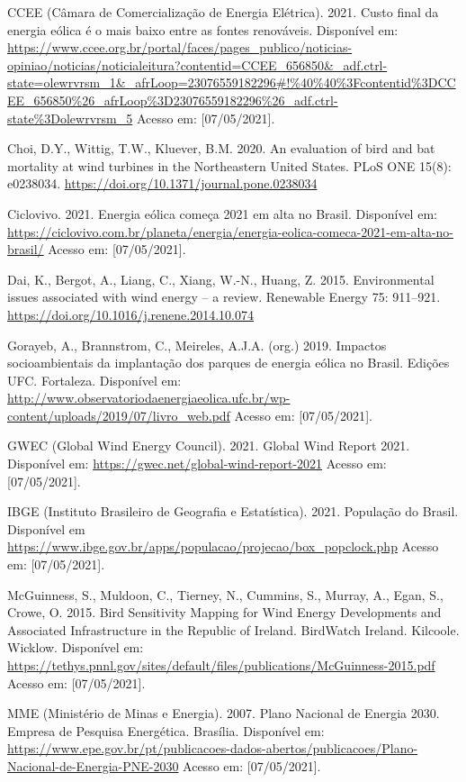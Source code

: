 \documentclass[
  oneside]{scrbook}
\begin{document}
CCEE (Câmara de Comercialização de Energia Elétrica). 2021. Custo final da energia eólica é o mais baixo entre as fontes renováveis. Disponível em: \url{https://www.ccee.org.br/portal/faces/pages_publico/noticias-opiniao/noticias/noticialeitura?contentid=CCEE_656850\&_adf.ctrl-state=olewrvrsm_1\&_afrLoop=23076559182296\#!\%40\%40\%3Fcontentid\%3DCCEE_656850\%26_afrLoop\%3D23076559182296\%26_adf.ctrl-state\%3Dolewrvrsm_5} Acesso em: {[}07/05/2021{]}.

Choi, D.Y., Wittig, T.W., Kluever, B.M. 2020. An evaluation of bird and bat mortality at wind turbines in the Northeastern United States. PLoS ONE 15(8): e0238034. \url{https://doi.org/10.1371/journal.pone.0238034}

Ciclovivo. 2021. Energia eólica começa 2021 em alta no Brasil. Disponível em: \url{https://ciclovivo.com.br/planeta/energia/energia-eolica-comeca-2021-em-alta-no-brasil/} Acesso em: {[}07/05/2021{]}.

Dai, K., Bergot, A., Liang, C., Xiang, W.-N., Huang, Z. 2015. Environmental issues associated with wind energy -- a review. Renewable Energy 75: 911--921. \url{https://doi.org/10.1016/j.renene.2014.10.074}

Gorayeb, A., Brannstrom, C., Meireles, A.J.A. (org.) 2019. Impactos socioambientais da implantação dos parques de energia eólica no Brasil. Edições UFC. Fortaleza. Disponível em: \url{http://www.observatoriodaenergiaeolica.ufc.br/wp-content/uploads/2019/07/livro_web.pdf} Acesso em: {[}07/05/2021{]}.

GWEC (Global Wind Energy Council). 2021. Global Wind Report 2021. Disponível em: \url{https://gwec.net/global-wind-report-2021} Acesso em: {[}07/05/2021{]}.

IBGE (Instituto Brasileiro de Geografia e Estatística). 2021. População do Brasil. Disponível em \url{https://www.ibge.gov.br/apps/populacao/projecao/box_popclock.php} Acesso em: {[}07/05/2021{]}.

McGuinness, S., Muldoon, C., Tierney, N., Cummins, S., Murray, A., Egan, S., Crowe, O. 2015. Bird Sensitivity Mapping for Wind Energy Developments and Associated Infrastructure in the Republic of Ireland. BirdWatch Ireland. Kilcoole. Wicklow. Disponível em: \url{https://tethys.pnnl.gov/sites/default/files/publications/McGuinness-2015.pdf} Acesso em: {[}07/05/2021{]}.

MME (Ministério de Minas e Energia). 2007. Plano Nacional de Energia 2030. Empresa de Pesquisa Energética. Brasília. Disponível em: \url{https://www.epe.gov.br/pt/publicacoes-dados-abertos/publicacoes/Plano-Nacional-de-Energia-PNE-2030} Acesso em: {[}07/05/2021{]}.
\end{document}

